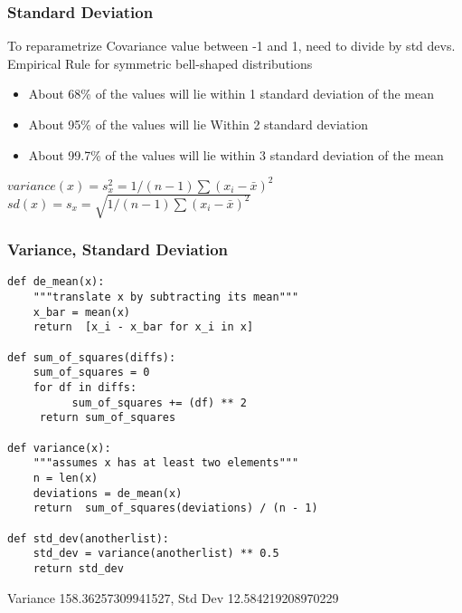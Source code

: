 \begin{frame}[fragile]\frametitle{Standard Deviation}	
To reparametrize Covariance value between -1 and 1, need to divide by std devs. Empirical Rule for symmetric bell-shaped distributions
\begin{itemize}
\item About 68\% of the values will lie within 1 standard deviation of the mean
\item About 95\% of the values will lie Within 2 standard deviation 
\item About 99.7\% of the values will lie within 3 standard deviation of the mean
\end{itemize}
$variance(x) = s_x^2 = 1/(n-1)\sum (x_i - \bar{x})^2$
$sd(x) = s_x = \sqrt{1/(n-1)\sum (x_i - \bar{x})^2}$
\end{frame}

 


\begin{frame}[fragile]\frametitle{Variance, Standard Deviation}
\begin{lstlisting}
def de_mean(x):
	"""translate x by subtracting its mean"""
	x_bar = mean(x)
	return	[x_i - x_bar for x_i in x]

def sum_of_squares(diffs):
	sum_of_squares = 0
	for df in diffs:
          sum_of_squares += (df) ** 2
     return sum_of_squares

def variance(x):
	"""assumes x has at	least two elements"""
	n = len(x)
	deviations = de_mean(x)
	return	sum_of_squares(deviations) / (n - 1)
 
def std_dev(anotherlist):
	std_dev = variance(anotherlist) ** 0.5
	return std_dev
\end{lstlisting}
Variance 158.36257309941527, Std Dev 12.584219208970229
\end{frame}


